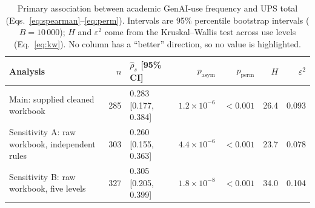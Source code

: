 \begin{table}[!htbp]
\centering
\caption{Primary association between academic GenAI-use frequency and UPS total (Eqs.~\ref{eq:spearman}--\ref{eq:perm}). Intervals are 95\% percentile bootstrap intervals ($B=10\,000$); $H$ and $\varepsilon^2$ come from the Kruskal--Wallis test across use levels (Eq.~\ref{eq:kw}). No column has a ``better'' direction, so no value is highlighted.}
\label{tab:association}
\footnotesize\setlength{\tabcolsep}{4pt}
\begin{tabular}{@{}lrlrrrr@{}}
\toprule
Analysis & $n$ & $\hat\rho_s$ [95\% CI] & $p_{\text{asym}}$ & $p_{\text{perm}}$ & $H$ & $\varepsilon^2$\\
\midrule

Main: supplied cleaned workbook & 285 & 0.283 [0.177, 0.384] & $1.2\times10^{-6}$ & $<0.001$ & 26.4 & 0.093\\

Sensitivity A: raw workbook, independent rules & 303 & 0.260 [0.155, 0.363] & $4.4\times10^{-6}$ & $<0.001$ & 23.7 & 0.078\\

Sensitivity B: raw workbook, five levels & 327 & 0.305 [0.205, 0.399] & $1.8\times10^{-8}$ & $<0.001$ & 34.0 & 0.104\\

\bottomrule
\end{tabular}
\end{table}

